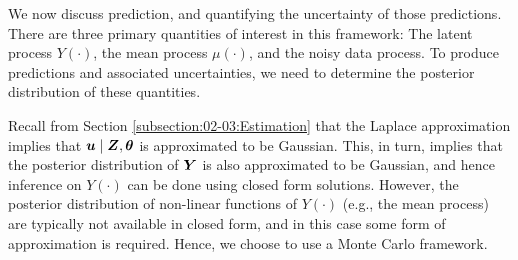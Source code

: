 \documentclass[article]{jss}
\newcommand{\red}[1]{\textcolor{red}{#1}}
\def\mbf#1{{%
\mathchoice%
{\hbox{\boldmath$\displaystyle{#1}$}}%
{\hbox{\boldmath$\textstyle{#1}$}}%
{\hbox{\boldmath$\scriptstyle{#1}$}}%
{\hbox{\boldmath$\scriptscriptstyle{#1}$}}%
}}
\def\vec{\mbf}
\newcommand{\Gau}{{\text{Gau}}}
\newcommand{\ECurly}[1]{\mathbb{E}\left\{#1\right\}} %
\newcommand{\tp}{{\!\scriptscriptstyle \top}}
\begin{document}
% 


We now discuss prediction, and quantifying the uncertainty of those predictions. 
There are three primary quantities of interest in this framework: The latent process $Y(\cdot)$, the  mean process $\mu(\cdot)$, and the noisy data process. 
 To produce predictions and associated uncertainties, we need to determine the posterior distribution of these quantities.

Recall from Section 
\ref{subsection:02-03:Estimation} 
 that the Laplace approximation implies that %
 $\vec{u} \mid \vec{Z}, \vec{\theta}$ is approximated to be Gaussian. %
 This, in turn, implies that the posterior distribution of $\vec{Y}$ is also approximated to be Gaussian, and hence inference on $Y(\cdot)$ can be done using closed form solutions. 
  However, the posterior distribution of non-linear functions of $Y(\cdot)$ (e.g., the mean process) are typically not available in closed form, and in this case some form of approximation is required.
   Hence, we choose to use a Monte Carlo framework.
\end{document}
